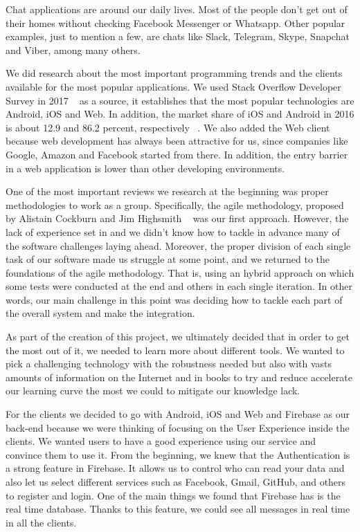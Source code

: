 Chat applications are around our daily lives. Most of the people don't get out of their homes without checking Facebook Messenger or Whatsapp. Other popular examples, just to mention a few, are chats like Slack, Telegram, Skype, Snapchat and Viber, among many others.

We did research about the most important programming trends and the clients available for the most popular applications. We used Stack Overflow Developer Survey in 2017 ~\cite{DeveloperStackoverflow} as a source, it establishes that the most popular technologies are Android, iOS and Web. In addition, the market share of iOS and Android in 2016 is about 12.9 and 86.2 percent, respectively ~\cite{DeveloperStackoverflow}.  We also added the Web client because web development has always been attractive for us, since companies like Google, Amazon and Facebook started from there. In addition, the entry barrier in a web application is lower than other developing environments.

One of the most important reviews we research at the beginning was proper methodologies to work as a group. Specifically, the agile methodology, proposed by Alistain Cockburn and Jim Highsmith ~\cite{rury346} was our first approach. However, the lack of experience set in and we didn't know how to tackle in advance many of the software challenges laying ahead. Moreover, the proper division of each single task of our software made us struggle at some point, and we  returned to the foundations of the agile methodology. That is, using an hybrid approach on which some tests were conducted at the end and others in each single iteration. In other words, our main challenge in this point was deciding how to tackle each part of the overall system and make the integration. 

As part of the creation of this project, we ultimately decided that in order to get the most out of it, we needed to learn more about different tools. We wanted to pick a challenging technology with the robustness needed but also with vasts amounts of information on the Internet and in books to try and reduce accelerate our learning curve the most we could to mitigate our knowledge lack. 

For the clients we decided to go with Android, iOS and Web and Firebase as our back-end because we were thinking of focusing on the User Experience inside the clients. We wanted users to have a good experience using our service and convince them to use it. From the beginning, we knew that the Authentication is a strong feature in Firebase. It allows us to control who can read your data and also let us select different services such as Facebook, Gmail, GitHub, and others to register and login. One of the main things we found that Firebase has is the real time database. Thanks to this feature, we could see all messages in real time in all the clients. 

